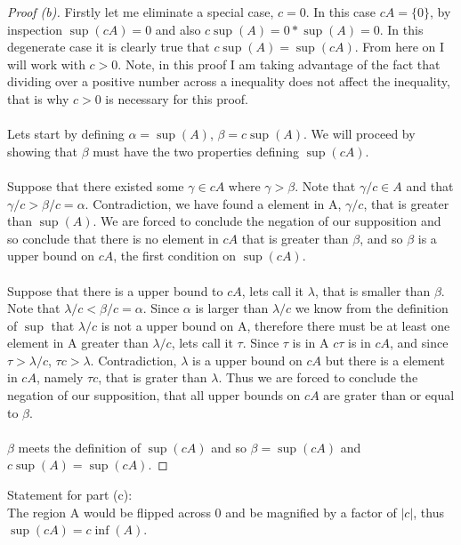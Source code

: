 \documentclass[12pt]{article}
\theoremstyle{homework}
\begin{document}
\begin{proof}[Proof (b)]
Firstly let me eliminate a special case, $c=0$.  In this case $cA=\{0\}$, by inspection $\sup(cA)=0$ and also $c\sup(A)=0*\sup(A)=0$.  In this degenerate case it is clearly true that $c\sup(A)=\sup(cA)$.  From here on I will work with $c>0$.  Note, in this proof I am taking advantage of the fact that dividing over a positive number across a inequality does not affect the inequality, that is why $c>0$ is necessary for this proof.\\\\
Lets start by defining $\alpha=\sup(A)$, $\beta=c\sup(A)$.  We will proceed by showing that $\beta$ must have the two properties defining $\sup(cA)$.\\\\
Suppose that there existed some $\gamma\in cA$ where $\gamma>\beta$.  Note that $\gamma/c\in A$ and that $\gamma/c>\beta/c=\alpha$.  Contradiction, we have found a element in A, $\gamma/c$, that is greater than $\sup(A)$.  We are forced to conclude the negation of our supposition and so conclude that there is no element in $cA$ that is greater than $\beta$, and so $\beta$ is a upper bound on $cA$, the first condition on $\sup(cA)$.\\\\
Suppose that there is a upper bound to $cA$, lets call it $\lambda$, that is smaller than $\beta$.  Note that $\lambda/c<\beta/c=\alpha$.  Since $\alpha$ is larger than $\lambda/c$ we know from the definition of $\sup$ that $\lambda/c$ is not a upper bound on A, therefore there must be at least one element in A greater than $\lambda/c$, lets call it $\tau$.  Since $\tau$ is in A $c\tau$ is in $cA$, and since $\tau>\lambda/c$, $\tau c>\lambda$.  Contradiction, $\lambda$ is a upper bound on $cA$ but there is a element in $cA$, namely $\tau c$, that is grater than $\lambda$.  Thus we are forced to conclude the negation of our supposition, that all upper bounds on $cA$ are grater than or equal to $\beta$.\\\\
$\beta$ meets the definition of $\sup(cA)$ and so $\beta=\sup(cA)$ and $c  \sup(A)=\sup(cA)$.
\end{proof}
Statement for part (c): \\
The region A would be flipped across $0$ and be magnified by a factor of $|c|$, thus $\sup(cA)=c \inf(A)$.
\end{document}
